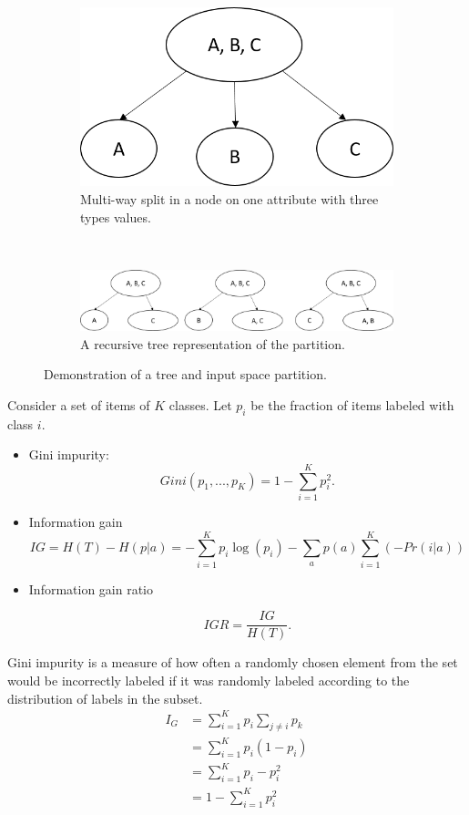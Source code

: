 \begin{refsection}
\begin{figure}[H]
	\centering	
	\begin{subfigure}[b]{0.42\textwidth}
		\centering
		\includegraphics[width=0.7\linewidth]{../figures/statisticalLearning/treeMethods/decisionTreeMultiwaySplit}
		\caption{Multi-way split in a node on one attribute with three types values.}
	\end{subfigure}\\
	\begin{subfigure}[b]{1.0\textwidth}
		\centering
		\includegraphics[width=0.7\linewidth]{../figures/statisticalLearning/treeMethods/decisionTreeBinarySplit}
		\caption{A recursive tree representation of the partition.}
	\end{subfigure}
	\caption{Demonstration of a tree and input space partition.}
\end{figure}


\begin{method}
Consider a set of items of $K$ classes. Let $p_i$ be the fraction of items labeled with class $i$. 


\begin{itemize}
	\item Gini impurity: 
	$$Gini(p_1,...,p_K) = 1 - \sum_{i=1}^K p_i^2.$$
	\item Information gain
	$$IG = H(T) - H(p|a) = -\sum_{i=1}^K p_i\log(p_i) - \sum_a p(a)\sum_{i=1}^K(-Pr(i|a))$$
	\item Information gain ratio
	
	$$IGR = \frac{IG}{H(T)}.$$
\end{itemize}	
\end{method}

\begin{remark}
Gini impurity is a measure of how often a randomly chosen element from the set would be incorrectly labeled if it was randomly labeled according to the distribution of labels in the subset.	
\begin{align*}
I_G &= \sum_{i=1}^K p_i \sum_{j\neq i}p_k\\
&=\sum_{i=1}^K p_i(1-p_i) \\
&=\sum_{i=1}^K p_i-p_i^2 \\
&=1 - \sum_{i=1}^K p_i^2
\end{align*}	
\end{remark}


\end{refsection}
